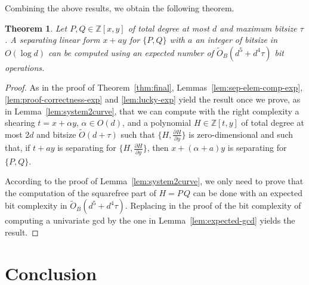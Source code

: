 \documentclass{sig-alternate}
\newtheorem{theorem}{Theorem}
\newcommand {\Z}   {\mathbb Z}
\newcommand{\OO}{\ensuremath{{{O}}}}
\newcommand{\sO}{\ensuremath{\widetilde{{O}}}}
\newcommand{\sOB}{\ensuremath{\widetilde{{O}}_B}}
\newcommand{\blue}[1]{\color{blue}#1\color{black}\xspace}
\renewcommand{\blue}[1]{#1\xspace}
\begin{document}
Combining the above results, we obtain the following theorem.


 \begin{theorem}\label{thm:las-vegas}
Let $P,Q \in \Z[x,y]$ of total degree at most $d$ and maximum bitsize $\tau$. A separating linear form $x+ay$ for $\{P,Q\}$ with $a$ an integer of bitsize in $\OO(\log d)$  can be computed using an expected number of $\sOB(d^5+d^4\tau)$ bit operations.
\end{theorem}

\begin{proof}
As in the proof of Theorem~\ref{thm:final}, Lemmas~\ref{lem:sep-elem-comp-exp},
\ref{lem:proof-correctness-exp} and \ref{lem:lucky-exp} yield the result once we prove, as in
Lemma~\ref{lem:system2curve}, that we can compute with the right complexity a
\blue{shearing}
 $t=x+\alpha y$, $\alpha\in O(d)$, and a polynomial $H \in \Z[t,y]$ of total degree at most
$2d$ and bitsize  $\sO(d+\tau)$ such that $\{H,\frac{\partial H}{\partial y}\}$ is
zero-dimensional and such that, if $t+ay$ is separating for $\{H,\frac{\partial H}{\partial y}\}$, then 
$x+(\alpha+a)y$ is separating for $\{P,Q\}$.
 
According to the proof of Lemma~\ref{lem:system2curve}, we only need to prove that the computation of the squarefree part of $H=P\,Q$ can be done with an expected bit complexity in $\sOB(d^5+d^4\tau)$. Replacing in the proof of \cite[Lemma 13]{sagraloff2013} the bit complexity of computing a univariate gcd by the one in Lemma~\ref{lem:expected-gcd} yields the result.  
\end{proof}







\section{Conclusion}
\end{document}
